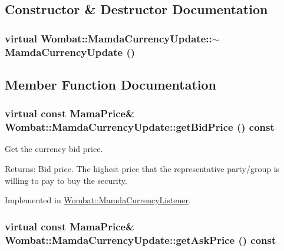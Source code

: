\subsection{Constructor \& Destructor Documentation}
\hypertarget{classWombat_1_1MamdaCurrencyUpdate_e5503eb4785cb3a1817a94b235b3cd3d}{
\subsubsection[$\sim$MamdaCurrencyUpdate]{\setlength{\rightskip}{0pt plus 5cm}virtual Wombat::Mamda\-Currency\-Update::$\sim$Mamda\-Currency\-Update ()}}
\label{classWombat_1_1MamdaCurrencyUpdate_e5503eb4785cb3a1817a94b235b3cd3d}




\subsection{Member Function Documentation}
\hypertarget{classWombat_1_1MamdaCurrencyUpdate_b3e155fe59d759e148c319ff92e8003b}{
\subsubsection[getBidPrice]{\setlength{\rightskip}{0pt plus 5cm}virtual const Mama\-Price\& Wombat::Mamda\-Currency\-Update::get\-Bid\-Price () const}}
\label{classWombat_1_1MamdaCurrencyUpdate_b3e155fe59d759e148c319ff92e8003b}


Get the currency bid price. 

\begin{Desc}
\item[Returns:]Bid price. The highest price that the representative party/group is willing to pay to buy the security. \end{Desc}


Implemented in \hyperlink{classWombat_1_1MamdaCurrencyListener_3563aac40f16c6dd61f64e9d9c2e1b2e}{Wombat::Mamda\-Currency\-Listener}.\hypertarget{classWombat_1_1MamdaCurrencyUpdate_a176e102ce277c24aa48d4ee2767ad6f}{
\subsubsection[getAskPrice]{\setlength{\rightskip}{0pt plus 5cm}virtual const Mama\-Price\& Wombat::Mamda\-Currency\-Update::get\-Ask\-Price () const}}
\label{classWombat_1_1MamdaCurrencyUpdate_a176e102ce277c24aa48d4ee2767ad6f}


